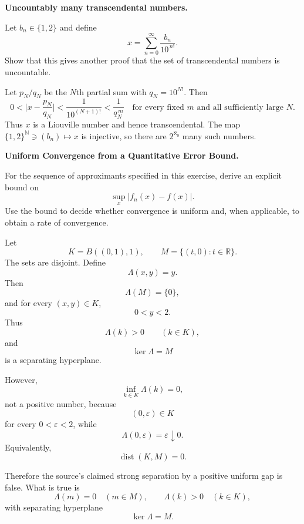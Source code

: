 \begin{problem}[CP-II-0378]
\label{prob:cp-ii-0378}
\textbf{Uncountably many transcendental numbers.}

\hspace*{1.5em}Let $b_n\in\{1,2\}$ and define
\[
x=\sum_{n=0}^{\infty}\frac{b_n}{10^{\,n!}}.
\]
Show that this gives another proof that the set of transcendental numbers is uncountable.
\end{problem}

\begin{solution}
Let $p_N/q_N$ be the $N$th partial sum with $q_N=10^{N!}$. Then
\[
0<\Big|x-\frac{p_N}{q_N}\Big|<\frac{1}{10^{(N+1)!}}<\frac{1}{q_N^{\,m}}
\quad\text{for every fixed }m\text{ and all sufficiently large }N.
\]
Thus $x$ is a Liouville number and hence transcendental. The map
$\{1,2\}^{\mathbb N}\ni(b_n)\mapsto x$ is injective, so there are $2^{\aleph_0}$ many such numbers.

\bigskip
\end{solution}

\begin{problem}[CP-II-0379]
\label{prob:cp-ii-0379}
\textbf{Uniform Convergence from a Quantitative Error Bound.}

\hspace*{1.5em}For the sequence of approximants specified in this exercise, derive an explicit
bound on
\[
\sup_x |f_n(x)-f(x)|.
\]
Use the bound to decide whether convergence is uniform and, when applicable,
to obtain a rate of convergence.
\end{problem}

\begin{solution}
Let
\[
K=B((0,1),1),
\qquad
M=\{(t,0):t\in\mathbb R\}.
\]
The sets are disjoint. Define
\[
\Lambda(x,y)=y.
\]
Then
\[
\Lambda(M)=\{0\},
\]
and for every \((x,y)\in K\),
\[
0<y<2.
\]
Thus
\[
\Lambda(k)>0
\qquad(k\in K),
\]
and
\[
\ker\Lambda=M
\]
is a separating hyperplane.

However,
\[
\inf_{k\in K}\Lambda(k)=0,
\]
not a positive number, because
\[
(0,\varepsilon)\in K
\]
for every \(0<\varepsilon<2\), while
\[
\Lambda(0,\varepsilon)=\varepsilon\downarrow0.
\]
Equivalently,
\[
\operatorname{dist}(K,M)=0.
\]

Therefore the source's claimed strong separation by a positive uniform gap is false. What is
true is
\[
\boxed{
\Lambda(m)=0\quad(m\in M),
\qquad
\Lambda(k)>0\quad(k\in K),
}
\]
with separating hyperplane
\[
\boxed{\ker\Lambda=M.}
\]
\end{solution}



